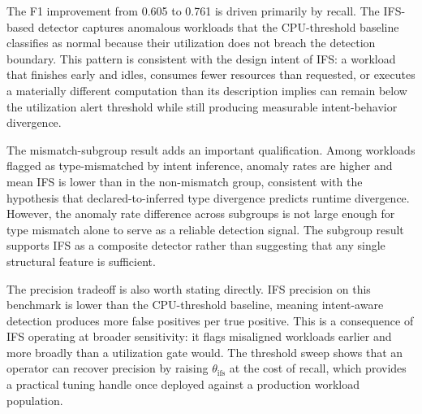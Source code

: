 
The F1 improvement from 0.605 to 0.761 is driven primarily by recall. The
IFS-based detector captures anomalous workloads that the CPU-threshold baseline
classifies as normal because their utilization does not breach the detection
boundary. This pattern is consistent with the design intent of IFS: a workload
that finishes early and idles, consumes fewer resources than requested, or
executes a materially different computation than its description implies can
remain below the utilization alert threshold while still producing measurable
intent-behavior divergence.

The mismatch-subgroup result adds an important qualification. Among workloads
flagged as type-mismatched by intent inference, anomaly rates are higher and
mean IFS is lower than in the non-mismatch group, consistent with the hypothesis
that declared-to-inferred type divergence predicts runtime divergence. However,
the anomaly rate difference across subgroups is not large enough for type
mismatch alone to serve as a reliable detection signal. The subgroup result
supports IFS as a composite detector rather than suggesting that any single
structural feature is sufficient.

The precision tradeoff is also worth stating directly. IFS precision on this
benchmark is lower than the CPU-threshold baseline, meaning intent-aware
detection produces more false positives per true positive. This is a consequence
of IFS operating at broader sensitivity: it flags misaligned workloads earlier
and more broadly than a utilization gate would. The threshold sweep shows that an
operator can recover precision by raising $\theta_{\mathrm{ifs}}$ at the cost of
recall, which provides a practical tuning handle once deployed against a
production workload population.
